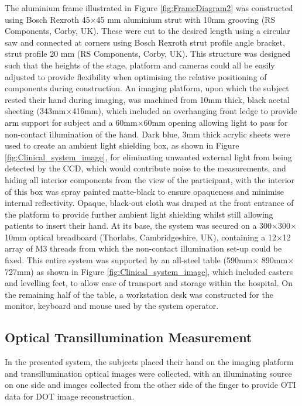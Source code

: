 \documentclass[twoside]{bhamthesis}
\theoremstyle{definition}
\begin{document}
The aluminium frame illustrated in Figure \ref{fig:FrameDiagram2} was constructed using Bosch Rexroth 45$\times$45 mm aluminium strut with 10mm grooving (RS Components, Corby, UK). These were cut to the desired length using a circular saw and connected at corners using Bosch Rexroth strut profile angle bracket, strut profile 20 mm (RS Components, Corby, UK). This structure was designed such that the heights of the stage, platform and cameras could all be easily adjusted to provide flexibility when optimising the relative positioning of components during construction. An imaging platform, upon which the subject rested their hand during imaging, was machined from 10mm thick, black acetal sheeting (343mm$\times$416mm), which included an overhanging front ledge to provide arm support for subject and a 60mm$\times$60mm opening allowing light to pass for non-contact illumination of the hand. Dark blue, 3mm thick acrylic sheets were used to create an ambient light shielding box, as shown in Figure \ref{fig:Clinical_system_image}, for eliminating unwanted external light from being detected by the CCD, which would contribute noise to the measurements, and hiding all interior components from the view of the participant, with the interior of this box was spray painted matte-black to ensure opaqueness and minimise internal reflectivity. Opaque, black-out cloth was draped at the front entrance of the platform to provide further ambient light shielding whilst still allowing patients to insert their hand. At its base, the system was secured on a 300$\times$300$\times$10mm optical breadboard (Thorlabs, Cambridgeshire, UK), containing a 12$\times$12 array of M3 threads from which the non-contact illumination set-up could be fixed. This entire system was supported by an all-steel table (590mm$\times$ 890mm$\times$727mm) as shown in Figure \ref{fig:Clinical_system_image}, which included casters and levelling feet, to allow ease of transport and storage within the hospital. On the remaining half of the table, a workstation desk was constructed for the monitor, keyboard and mouse used by the system operator.

\subsection{Optical Transillumination Measurement}

In the presented system, the subjects placed their hand on the imaging platform and transillumination optical images were collected, with an illuminating source on one side and images collected from the other side of the finger to provide OTI data for DOT image reconstruction. 
\end{document}
